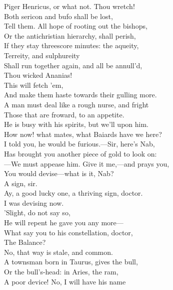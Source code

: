 \documentclass[a4paper,oneside]{memoir}
\begin{document}
\begin{drama*}
Piger Henricus, or what not. Thou wretch!\\
Both sericon and bufo shall be lost,\\
Tell them. All hope of rooting out the bishops,\\
Or the antichristian hierarchy, shall perish,\\
If they stay threescore minutes: the aqueity,\\
Terreity, and sulphureity\\
Shall run together again, and all be annull'd,\\
Thou wicked Ananias!\\
This will fetch 'em,\\
And make them haste towards their gulling more.\\
A man must deal like a rough nurse, and fright\\
Those that are froward, to an appetite.\\
\facespeaks He is busy with his spirits, but we'll upon him.\\
\subtlespeaks How now! what mates, what Baiards have we here?\\
\facespeaks I told you, he would be furious.---Sir, here's Nab,\\
Has brought you another piece of gold to look on:\\
---We must appease him. Give it me,---and prays you,\\
You would devise---what is it, Nab?\\
\druggerspeaks {} A sign, sir.\\
\facespeaks Ay, a good lucky one, a thriving sign, doctor.\\
\subtlespeaks I was devising now.\\
\facespeaks {} 'Slight, do not say so,\\
He will repent he gave you any more---\\
What say you to his constellation, doctor,\\
The Balance?\\
\subtlespeaks {} No, that way is stale, and common.\\
A townsman born in Taurus, gives the bull,\\
Or the bull's-head: in Aries, the ram,\\
A poor device! No, I will have his name\\

\end{drama*}
\end{document}
